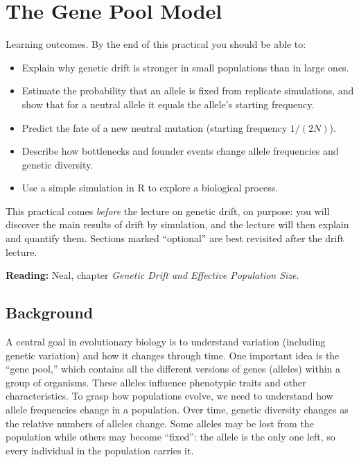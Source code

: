 \documentclass[
  a4paper]{book}
\providecommand{\tightlist}{%
  \setlength{\itemsep}{0pt}\setlength{\parskip}{0pt}}
\begin{document}
\chapter{The Gene Pool Model}\label{the-gene-pool-model}

Learning outcomes. By the end of this practical you should be able to:

\begin{itemize}
\tightlist
\item
  Explain why genetic drift is stronger in small populations than in large ones.
\item
  Estimate the probability that an allele is fixed from replicate simulations, and show that for a neutral allele it equals the allele's starting frequency.
\item
  Predict the fate of a new neutral mutation (starting frequency \(1/(2N)\)).
\item
  Describe how bottlenecks and founder events change allele frequencies and genetic diversity.
\item
  Use a simple simulation in R to explore a biological process.
\end{itemize}

This practical comes \emph{before} the lecture on genetic drift, on purpose: you will discover the main results of drift by simulation, and the lecture will then explain and quantify them. Sections marked ``optional'' are best revisited after the drift lecture.

\textbf{Reading:} Neal, chapter \emph{Genetic Drift and Effective Population Size}.

\section{Background}\label{background-14}

A central goal in evolutionary biology is to understand variation (including genetic variation) and how it changes through time. One important idea is the ``gene pool,'' which contains all the different versions of genes (alleles) within a group of organisms. These alleles influence phenotypic traits and other characteristics. To grasp how populations evolve, we need to understand how allele frequencies change in a population. Over time, genetic diversity changes as the relative numbers of alleles change. Some alleles may be lost from the population while others may become ``fixed'': the allele is the only one left, so every individual in the population carries it.
\end{document}
